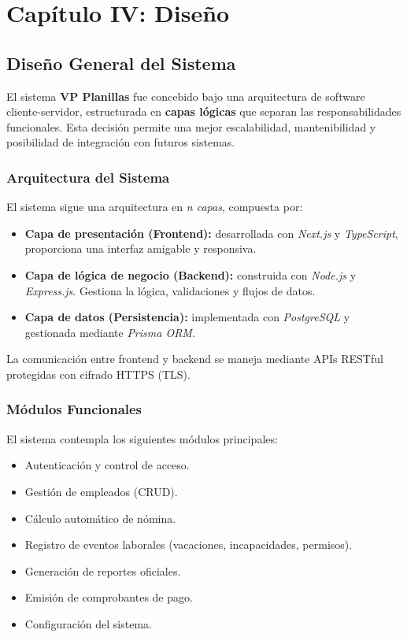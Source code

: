\chapter{Capítulo IV: Diseño}
\section{Diseño General del Sistema}

El sistema \textbf{VP Planillas} fue concebido bajo una arquitectura de software cliente-servidor, estructurada en \textbf{capas lógicas} que separan las responsabilidades funcionales. Esta decisión permite una mejor escalabilidad, mantenibilidad y posibilidad de integración con futuros sistemas.

\subsection{Arquitectura del Sistema}

El sistema sigue una arquitectura en \textit{n capas}, compuesta por:

\begin{itemize}
	\item \textbf{Capa de presentación (Frontend):} desarrollada con \textit{Next.js} y \textit{TypeScript}, proporciona una interfaz amigable y responsiva.
	\item \textbf{Capa de lógica de negocio (Backend):} construida con \textit{Node.js} y \textit{Express.js}. Gestiona la lógica, validaciones y flujos de datos.
	\item \textbf{Capa de datos (Persistencia):} implementada con \textit{PostgreSQL} y gestionada mediante \textit{Prisma ORM}.
\end{itemize}

La comunicación entre frontend y backend se maneja mediante APIs RESTful protegidas con cifrado HTTPS (TLS).

\subsection{Módulos Funcionales}

El sistema contempla los siguientes módulos principales:

\begin{itemize}
	\item Autenticación y control de acceso.
	\item Gestión de empleados (CRUD).
	\item Cálculo automático de nómina.
	\item Registro de eventos laborales (vacaciones, incapacidades, permisos).
	\item Generación de reportes oficiales.
	\item Emisión de comprobantes de pago.
	\item Configuración del sistema.
\end{itemize}

